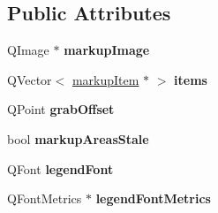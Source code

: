 \subsection*{Public Attributes}
\begin{DoxyCompactItemize}
\item 
\hypertarget{classimageMarkup_a435ac89504244ad48dcab3680f549fe1}{
QImage $\ast$ {\bfseries markupImage}}
\label{classimageMarkup_a435ac89504244ad48dcab3680f549fe1}

\item 
\hypertarget{classimageMarkup_aa68007687a3e28ec62e5ff6abaca412f}{
QVector$<$ \hyperlink{classmarkupItem}{markupItem} $\ast$ $>$ {\bfseries items}}
\label{classimageMarkup_aa68007687a3e28ec62e5ff6abaca412f}

\item 
\hypertarget{classimageMarkup_a06752e238e76e01cde51452eff6fc180}{
QPoint {\bfseries grabOffset}}
\label{classimageMarkup_a06752e238e76e01cde51452eff6fc180}

\item 
\hypertarget{classimageMarkup_a3d7427247a4f9bcb34995e2ed737a67f}{
bool {\bfseries markupAreasStale}}
\label{classimageMarkup_a3d7427247a4f9bcb34995e2ed737a67f}

\item 
\hypertarget{classimageMarkup_a537c83f415a315bff010cdd79a791989}{
QFont {\bfseries legendFont}}
\label{classimageMarkup_a537c83f415a315bff010cdd79a791989}

\item 
\hypertarget{classimageMarkup_a53e1fbae784af4ff90ab16631ce57f2d}{
QFontMetrics $\ast$ {\bfseries legendFontMetrics}}
\label{classimageMarkup_a53e1fbae784af4ff90ab16631ce57f2d}

\end{DoxyCompactItemize}
